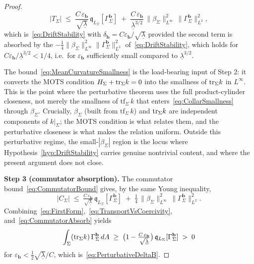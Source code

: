 \begin{proof}
\begin{equation}\label{eq:TransportVsCoercivity}
    |T_\Sigma|\;\le\;\frac{C\,\varepsilon_{\mathbf b}}{\sqrt{\underline\lambda}}\,\mathfrak q_{L_\Sigma}[\Gamma_\Sigma^{\mathbf b}]
    \;+\;\frac{C\,\varepsilon_{\mathbf b}}{\underline\lambda^{3/2}}\,\|\beta_\Sigma\|_{L^\infty}^2\,\|\Gamma_\Sigma^{\mathbf b}\|_{L^2}^2 ,
\end{equation}
which is~\eqref{eq:DriftStability} with $\delta_{\mathbf b}=C\varepsilon_{\mathbf b}/\sqrt{\underline\lambda}$ provided the second term is absorbed by the $-\tfrac14\|\beta_\Sigma\|_{L^\infty}^2\|\Gamma_\Sigma^{\mathbf b}\|_{L^2}^2$ of~\eqref{eq:DriftStability}, which holds for $C\varepsilon_{\mathbf b}/\underline\lambda^{3/2}<1/4$, i.e.\ for $\varepsilon_{\mathbf b}$ sufficiently small compared to $\underline\lambda^{3/2}$.

\begin{remark}\label{rem:PerturbativeHonesty}
The bound~\eqref{eq:MeanCurvatureSmallness} is the load-bearing input of Step 2: it converts the MOTS condition $H_\Sigma+\mathrm{tr}_\Sigma k=0$ into the smallness of $\mathrm{tr}_\Sigma k$ in $L^\infty$. This is the point where the perturbative theorem uses the full product-cylinder closeness, not merely the smallness of $\mathrm{tf}_\Sigma\,k$ that enters~\eqref{eq:CollarSmallness} through $\beta_\Sigma$. Crucially, $\beta_\Sigma$ (built from $\mathrm{tf}_\Sigma\,k$) and $\mathrm{tr}_\Sigma k$ are independent components of $k|_\Sigma$; the MOTS condition is what relates them, and the perturbative closeness is what makes the relation uniform. Outside this perturbative regime, the small-$|\beta_\Sigma|$ region is the locus where Hypothesis~\ref{hyp:DriftStability} carries genuine nontrivial content, and where the present argument does not close.
\end{remark}

\textbf{Step 3 (commutator absorption).}
The commutator bound~\eqref{eq:CommutatorBound} gives, by the same Young inequality,
\begin{equation}\label{eq:CommutatorAbsorb}
    |C_\Sigma|\;\le\;\tfrac{C\,\varepsilon_{\mathbf b}}{\sqrt{\underline\lambda}}\,\mathfrak q_{L_\Sigma}[\Gamma_\Sigma^{\mathbf b}]
    \;+\;\tfrac14\,\|\beta_\Sigma\|_{L^\infty}^2\,\|\Gamma_\Sigma^{\mathbf b}\|_{L^2}^2 .
\end{equation}
Combining~\eqref{eq:FirstForm},~\eqref{eq:TransportVsCoercivity}, and~\eqref{eq:CommutatorAbsorb} yields
\[
    \int_\Sigma(\mathrm{tr}_\Sigma k)\,\Gamma_\Sigma^{\mathbf b}\,dA
    \;\ge\;
    \bigl(1-\tfrac{C\,\varepsilon_{\mathbf b}}{\sqrt{\underline\lambda}}\bigr)\,\mathfrak q_{L_\Sigma}[\Gamma_\Sigma^{\mathbf b}]
    \;>\;0
\]
for $\varepsilon_{\mathbf b}<\tfrac12\sqrt{\underline\lambda}/C$, which is~\eqref{eq:PerturbativeDeltaB}.
\end{proof}

